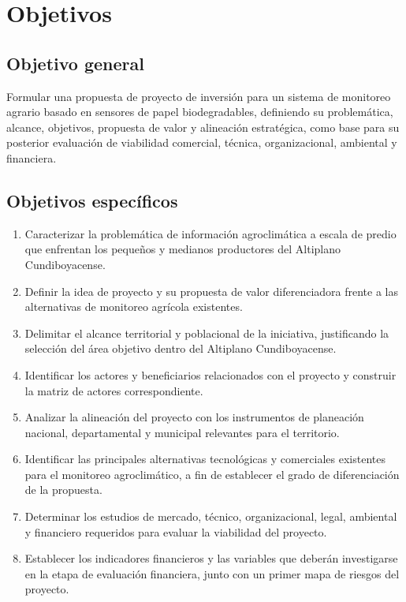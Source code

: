 \documentclass[11pt,a4paper]{article}
\begin{document}
\section{Objetivos}

\subsection{Objetivo general}
Formular una propuesta de proyecto de inversión para un sistema de monitoreo agrario basado en sensores de papel biodegradables, definiendo su problemática, alcance, objetivos, propuesta de valor y alineación estratégica, como base para su posterior evaluación de viabilidad comercial, técnica, organizacional, ambiental y financiera.

\subsection{Objetivos específicos}
\begin{enumerate}
\item Caracterizar la problemática de información agroclimática a escala de predio que enfrentan los pequeños y medianos productores del Altiplano Cundiboyacense.
\item Definir la idea de proyecto y su propuesta de valor diferenciadora frente a las alternativas de monitoreo agrícola existentes.
\item Delimitar el alcance territorial y poblacional de la iniciativa, justificando la selección del área objetivo dentro del Altiplano Cundiboyacense.
\item Identificar los actores y beneficiarios relacionados con el proyecto y construir la matriz de actores correspondiente.
\item Analizar la alineación del proyecto con los instrumentos de planeación nacional, departamental y municipal relevantes para el territorio.
\item Identificar las principales alternativas tecnológicas y comerciales existentes para el monitoreo agroclimático, a fin de establecer el grado de diferenciación de la propuesta.
\item Determinar los estudios de mercado, técnico, organizacional, legal, ambiental y financiero requeridos para evaluar la viabilidad del proyecto.
\item Establecer los indicadores financieros y las variables que deberán investigarse en la etapa de evaluación financiera, junto con un primer mapa de riesgos del proyecto.
\end{enumerate}
\end{document}
